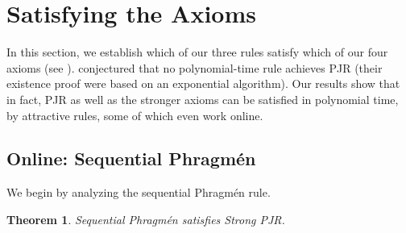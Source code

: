 \documentclass[10pt]{scrartcl}
\theoremstyle{plain}
\newtheorem{theorem}{Theorem}[section]
\theoremstyle{definition}
\begin{document}
 \section{Satisfying the Axioms}
\label{sec:guarantees}

In this section, we establish which of our three rules satisfy which of our four axioms (see ).
\citet{bulteau2021jr} conjectured that no polynomial-time rule achieves PJR (their existence proof were based on an exponential algorithm). Our results show that in fact, PJR as well as the stronger axioms can be satisfied in polynomial time, by attractive rules, some of which even work online.

\subsection{Online: Sequential Phragm\'en}
\label{sec:guarantees:phragmen}

We begin by analyzing the sequential Phragm\'en rule. 
\begin{theorem}
    Sequential Phragm\'en satisfies Strong PJR.
\end{theorem}
\end{document}
